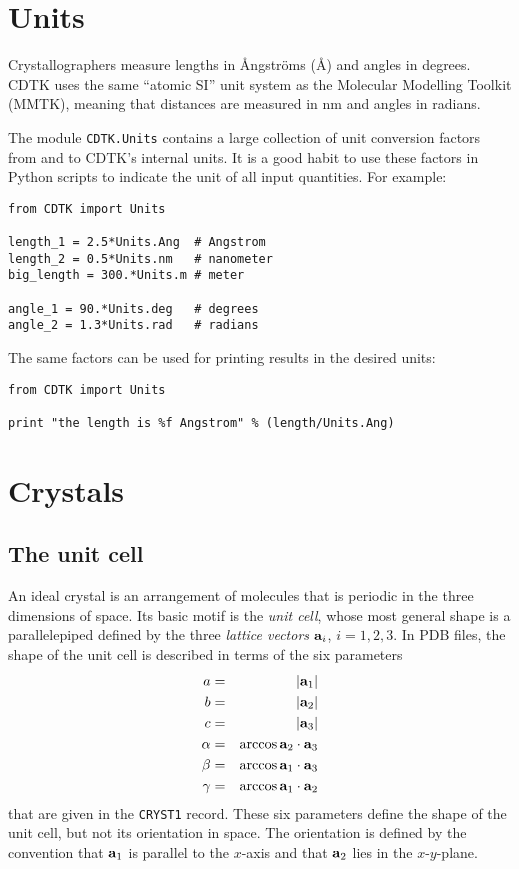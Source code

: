 \documentclass[12pt]{article}
\newcommand{\vect}[1]{{\bf #1}}
\newcommand{\va}{\vect{a}}
\begin{document}
\newpage
\begin{sloppy}

\section{Units}

Crystallographers measure lengths in {\AA}ngstr{\"om}s (\AA) and angles
in degrees. CDTK uses the same ``atomic SI'' unit system as the
Molecular Modelling Toolkit (MMTK), meaning that distances are
measured in nm and angles in radians.

The module \texttt{CDTK.Units} contains a large collection of unit
conversion factors from and to CDTK's internal units. It is a good
habit to use these factors in Python scripts to indicate the unit
of all input quantities. For example:

\begin{verbatim}
from CDTK import Units

length_1 = 2.5*Units.Ang  # Angstrom
length_2 = 0.5*Units.nm   # nanometer
big_length = 300.*Units.m # meter

angle_1 = 90.*Units.deg   # degrees
angle_2 = 1.3*Units.rad   # radians
\end{verbatim}

The same factors can be used for printing results in the desired units:

\begin{verbatim}
from CDTK import Units

print "the length is %f Angstrom" % (length/Units.Ang)
\end{verbatim}


\section{Crystals}

\subsection{The unit cell}

An ideal crystal is an arrangement of molecules that is periodic in
the three dimensions of space. Its basic motif is the \textit{unit cell},
whose most general shape is a parallelepiped defined by the three
\textit{lattice vectors} $\va_i$, $i=1, 2, 3$.
In PDB files, the shape of the unit cell is described
in terms of the six parameters
\begin{eqnarray}
a &=& |\va_1| \nonumber \\
b &=& |\va_2| \nonumber \\
c &=& |\va_3| \nonumber \\
\alpha &=& \arccos \va_2\cdot\va_3 \nonumber \\
\beta  &=& \arccos \va_1\cdot\va_3 \nonumber \\
\gamma &=& \arccos \va_1\cdot\va_2 \nonumber
\end{eqnarray}
that are given in the \texttt{CRYST1} record.
These six parameters define the shape of the unit cell, but not its
orientation in space. The orientation is defined by the convention
that $\va_1$ is parallel to the $x$-axis and that $\va_2$
lies in the $x$-$y$-plane.


\end{sloppy}
\end{document}
